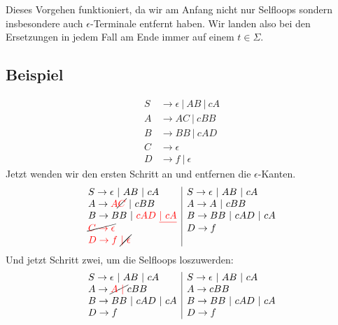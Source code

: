 \documentclass{article}
\begin{document}
Dieses Vorgehen funktioniert, da wir am Anfang nicht nur Selfloops sondern insbesondere auch $\epsilon$-Terminale entfernt haben. Wir landen also bei den Ersetzungen in jedem Fall am Ende immer auf einem $t \in \Sigma$.

\newpage
\subsection*{Beispiel}
\begin{align*}
S &\rightarrow \epsilon \ |\ AB \ |\ cA\\
A &\rightarrow AC \ |\ cBB\\
B &\rightarrow BB\ |\ cAD\\
C &\rightarrow \epsilon\\
D &\rightarrow f \ |\ \epsilon
\end{align*}
Jetzt wenden wir den ersten Schritt an und entfernen die $\epsilon$-Kanten.
\begin{align*}
\begin{array}{l|l}
S \rightarrow \epsilon \ |\ AB \ |\ cA                                 & S \rightarrow \epsilon \ |\ AB \ |\ cA \\ 
A \rightarrow {\color{red}A}\text{\cancel{\color{red}$C$}} \ |\ cBB    & A \rightarrow A\ |\ cBB                \\
B \rightarrow BB\ |\ {\color{red}cAD\ \underline{|\ cA}}               & B \rightarrow BB\ |\ cAD\ |\ cA        \\
\text{\cancel{${\color{red}C \rightarrow \epsilon}$}}                  & D \rightarrow f                        \\
{\color{red}D \rightarrow f}\ \text{\cancel{\color{red}$|\ \epsilon$}} & 
\end{array}
\end{align*}
Und jetzt Schritt zwei, um die Selfloops loszuwerden:
\begin{align*}
\begin{array}{l|l}
S \rightarrow \epsilon \ |\ AB \ |\ cA               & S \rightarrow \epsilon \ |\ AB \ |\ cA \\
A \rightarrow \text{\cancel{\color{red}$A\ |\ $}}cBB & A \rightarrow cBB                      \\
B \rightarrow BB\ |\ cAD\ |\ cA                      & B \rightarrow BB\ |\ cAD\ |\ cA        \\
D \rightarrow f                                      & D \rightarrow f
\end{array}
\end{align*}
\end{document}
